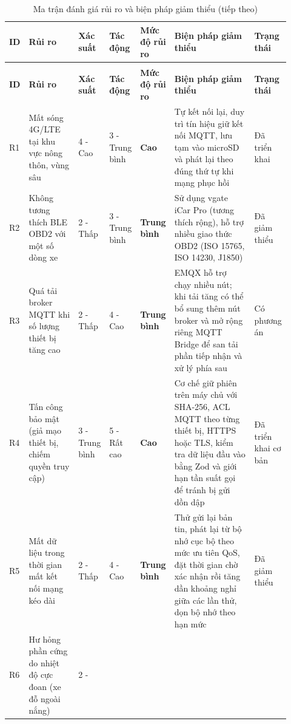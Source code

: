 \documentclass[a4paper]{extarticle}
\newcommand{\thesissettableid}[2]{%
  \renewcommand{\thetable}{#1}%
  \renewcommand{\theHtable}{#2}%
}
\begin{document}
{\thesissettableid{5.8}{tab-ch5-ma-tran-anh-gia-rui-ro-va-bien-phap-giam-thieu}
\def\LTcaptype{table}
\begin{longtable}{|L{0.055\linewidth}|L{0.180\linewidth}|L{0.090\linewidth}|L{0.090\linewidth}|L{0.120\linewidth}|L{0.300\linewidth}|L{0.090\linewidth}|}
\caption{Ma trận đánh giá rủi ro và biện pháp giảm thiểu}\label{tab:ch5-ma-tran-anh-gia-rui-ro-va-bien-phap-giam-thieu}\\
\hline \textbf{ID} & \textbf{Rủi ro} & \textbf{Xác suất} & \textbf{Tác động} & \textbf{Mức độ rủi ro} & \textbf{Biện pháp giảm thiểu} & \textbf{Trạng thái} \\
\hline
\endfirsthead
\caption[]{Ma trận đánh giá rủi ro và biện pháp giảm thiểu (tiếp theo)}\\
\hline \textbf{ID} & \textbf{Rủi ro} & \textbf{Xác suất} & \textbf{Tác động} & \textbf{Mức độ rủi ro} & \textbf{Biện pháp giảm thiểu} & \textbf{Trạng thái} \\
\hline
\endhead
\hline
\endfoot
\endlastfoot
R1 & Mất sóng 4G/LTE tại khu vực nông thôn, vùng sâu & 4 - Cao & 3 -
Trung bình & \textbf{Cao} & Tự kết nối lại, duy trì tín hiệu giữ kết nối
MQTT, lưu tạm vào microSD và phát lại theo đúng thứ tự khi mạng phục hồi & Đã triển khai \\\hline
R2 & Không tương thích BLE OBD2 với một số dòng xe & 2 - Thấp & 3 -
Trung bình & \textbf{Trung bình} & Sử dụng vgate iCar Pro (tương thích
rộng), hỗ trợ nhiều giao thức OBD2 (ISO 15765, ISO 14230, J1850) & Đã
giảm thiểu \\\hline
R3 & Quá tải broker MQTT khi số lượng thiết bị tăng cao & 2 - Thấp & 4 -
Cao & \textbf{Trung bình} & EMQX hỗ trợ chạy nhiều nút; khi tải tăng có
thể bổ sung thêm nút broker và mở rộng riêng MQTT Bridge để san tải phần tiếp
nhận và xử lý phía sau & Có phương án \\\hline
R4 & Tấn công bảo mật (giả mạo thiết bị, chiếm quyền truy cập) & 3 -
Trung bình & 5 - Rất cao & \textbf{Cao} & Cơ chế giữ phiên trên máy chủ với
SHA-256, ACL MQTT theo từng thiết bị, HTTPS hoặc TLS, kiểm tra dữ liệu đầu vào bằng Zod và giới hạn tần suất gọi để tránh bị gửi dồn dập & Đã triển khai cơ bản \\\hline
R5 & Mất dữ liệu trong thời gian mất kết nối mạng kéo dài & 2 - Thấp & 4
- Cao & \textbf{Trung bình} & Thử gửi lại bản tin, phát lại từ bộ nhớ cục bộ theo mức ưu tiên QoS,
đặt thời gian chờ xác nhận rồi tăng dần khoảng nghỉ giữa các lần thử, dọn bộ nhớ theo hạn mức & Đã giảm thiểu \\\hline
R6 & Hư hỏng phần cứng do nhiệt độ cực đoan (xe đỗ ngoài nắng) & 2 -

\end{longtable}}
\end{document}
